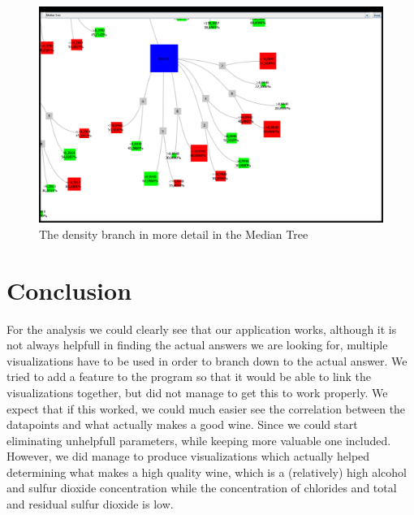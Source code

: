 \documentclass[a4paper,twoside,11pt]{article}
\begin{document}
\begin{figure}[!h]
  \centering
  \includegraphics[width=\textwidth]{images/20131105041127plot.png}
  \caption{The density branch in more detail in the Median Tree}
  \label{rsmt}
\end{figure}

\section{Conclusion}
For the analysis we could clearly see that our application works, although it is not always helpfull in finding the actual answers we are looking for, multiple visualizations have to be used in order to branch down to the actual answer. We tried to add a feature to the program so that it would be able to link the visualizations together, but did not manage to get this to work properly. We expect that if this worked, we could much easier see the correlation between the datapoints and what actually makes a good wine. Since we could start eliminating unhelpfull parameters, while keeping more valuable one included. \\

However, we did manage to produce visualizations which actually helped determining what makes a high quality wine, which is a (relatively) high alcohol and sulfur dioxide concentration while the concentration of chlorides and total and residual sulfur dioxide is low.
\end{document}
